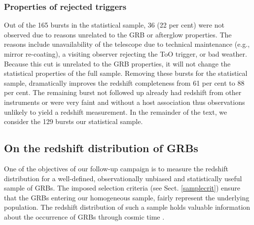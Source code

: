 \documentclass{aa}    %
\begin{document}
\subsubsection{Properties of rejected triggers} \label{badbursts}

Out of the 165 bursts in the statistical sample, 36 (22 per cent) were
not observed due to reasons unrelated to the GRB or afterglow properties. The
reasons include unavailability of the telescope due to technical maintenance
(e.g., mirror re-coating), a visiting observer rejecting the ToO trigger, or bad
weather. Because this cut is unrelated to the GRB properties, it will not change
the statistical properties of the full sample. Removing these bursts for the
statistical sample, dramatically improves the redshift completeness from 61 per cent to 88
per cent. The remaining burst not followed up already had redshift from other
instruments or were very faint and without a host association thus observations
unlikely to yield a redshift measurement. In the remainder of the text, we
consider the 129 bursts our statistical sample.

\subsection{On the redshift distribution of GRBs} \label{redshift}

One of the objectives of our follow-up campaign is to measure the redshift
distribution for a well-defined, observationally unbiased and statistically useful
sample of GRBs. The imposed selection criteria (see Sect. \ref{samplecrit})
ensure that the GRBs entering our homogeneous sample, fairly represent the
underlying population. The redshift distribution of such a sample holds valuable
information about the occurrence of GRBs through cosmic time
\citep{Jakobsson2012, Perley2016a}.


\end{document}
